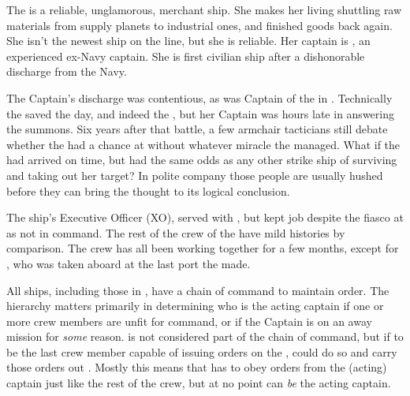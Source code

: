 \documentclass[blue]{TMFHope}
\begin{document}
\name{\bHope{}}

The \pNew{} is a reliable, unglamorous, merchant ship. She makes her living shuttling raw materials from supply planets to industrial ones, and finished goods back again. She isn't the newest ship on the line, but she is reliable. Her captain is \cCap{\full}, an experienced ex-Navy captain. She is \cCap{\their} first civilian ship after a dishonorable discharge from the Navy.  

The Captain's discharge was contentious, as \cCap{} was Captain of the \pOld{} in \pBattle{}. Technically the \pOld{} saved the day, and indeed the \pPlan{}, but her Captain was hours late in answering the summons. Six years after that battle, a few armchair tacticians still debate whether the \pPlan{} had a chance at \pHome{} without whatever miracle the \pOld{} managed. What if the \pOld{} had arrived on time, but had the same odds as any other strike ship of surviving and taking out her target? In polite company those people are usually hushed before they can bring the thought to its logical conclusion.

The ship's Executive Officer (XO), \cXO{} served with \cCap{}, but kept \cXO{\their} job despite the fiasco at \pBattle{} as \cXO{\they} \cXO{\were} not in command. The rest of the crew of the \pNew{} have mild histories by comparison. The crew has all been working together for a few months, except for \cBoy{}, who was taken aboard at the last port the \pNew{} made. 

All ships, including those in \pTMF{}, have a chain of command to maintain order. The hierarchy matters primarily in determining who is the acting captain if one or more crew members are unfit for command, or if the Captain is on an away mission for \emph{some} reason. \cBoy{} is not considered part of the chain of command, but if \cBoy{\they} \cBoy{\were} to be the last crew member capable of issuing orders on the \pNew{}, \cBoy{\they} could do so and carry those orders out \cBoy{\themself}. Mostly this means that \cBoy{} has to obey orders from the (acting) captain just like the rest of the crew, but at no point can \cBoy{} \emph{be} the acting captain.
\end{document}
